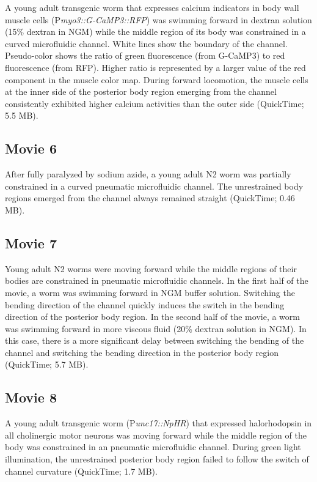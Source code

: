 A young adult transgenic worm that expresses calcium indicators in body wall muscle cells 
(P\textit{myo3::G-CaMP3::RFP}) was swimming forward in dextran solution (15\% dextran in NGM) 
while the middle region of its body was constrained in a curved microfluidic channel. White 
lines show the boundary of the channel. Pseudo-color shows the ratio of green fluorescence 
(from G-CaMP3) to red fluorescence (from RFP). Higher ratio is represented by a larger value of 
the red component in the muscle color map. During forward locomotion, the muscle cells at the 
inner side of the posterior body region emerging from the channel consistently exhibited higher 
calcium activities than the outer side (QuickTime; 5.5 MB). 
 
\subsection{Movie 6}\label{movie:prop6}
 
After fully paralyzed by sodium azide, a young adult N2 worm was partially constrained in a 
curved pneumatic microfluidic channel. The unrestrained body regions emerged from the 
channel always remained straight (QuickTime; 0.46 MB).    
 
\subsection{Movie 7}\label{movie:prop7}
 
Young adult N2 worms were moving forward while the middle regions of their bodies are 
constrained in pneumatic microfluidic channels. In the first half of the movie, a worm was 
swimming forward in NGM buffer solution. Switching the bending direction of the channel 
quickly induces the switch in the bending direction of the posterior body region. In the second 
half of the movie, a worm was swimming forward in more viscous fluid (20\% dextran solution in 
NGM). In this case, there is a more significant delay between switching the bending of the 
channel and switching the bending direction in the posterior body region (QuickTime; 5.7 MB). 
 
\subsection{Movie 8}\label{movie:prop8} 
 
A young adult transgenic worm (P\textit{unc17::NpHR}) that expressed halorhodopsin in all cholinergic 
motor neurons was moving forward while the middle region of the body was constrained in an 
pneumatic microfluidic channel. During green light illumination, the unrestrained posterior body 
region failed to follow the switch of channel curvature (QuickTime; 1.7 MB). 
 
